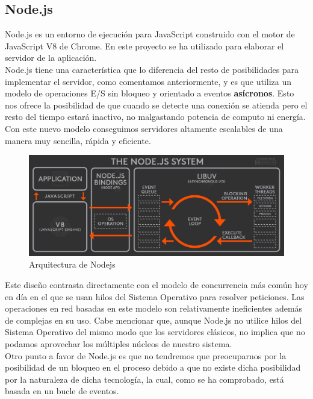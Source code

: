 \subsection{Node.js}

Node.js es un entorno de ejecución para JavaScript construido con el motor de JavaScript
V8 de Chrome. En este proyecto se ha utilizado para elaborar el servidor de la aplicación.\\

Node.js tiene una característica que lo diferencia del resto de posibilidades para implementar 
el servidor, como comentamos anteriormente, y es que utiliza un modelo de operaciones E/S sin bloqueo y orientado a eventos 
\textbf{asícronos}. Esto nos ofrece la posibilidad de que cuando se detecte una conexión se atienda
pero el resto del tiempo estará inactivo, no malgastando potencia de computo ni energía. Con este nuevo modelo conseguimos servidores altamente 
escalables de una manera muy sencilla, rápida y eficiente.\\

\begin{figure}[H]
	\centering
	\includegraphics[scale=0.25]{imagenes/nodejs_system.jpg}
	\caption{Arquitectura de Nodejs\cite{image-node-arch} \label{fig:figura1}}
\end{figure}

Este diseño contrasta directamente con el modelo de concurrencia más común hoy en 
día en el que se usan hilos del Sistema Operativo para resolver peticiones. Las operaciones en red basadas en este modelo son relativamente ineficientes además de complejas en su uso. Cabe mencionar que, aunque Node.js 
no utilice hilos del Sistema Operativo del mismo modo que los servidores clásicos, no implica que no podamos aprovechar los múltiples núcleos de nuestro sistema.\\

Otro punto a favor de Node.js es que no tendremos que preocuparnos por la posibilidad de un 
bloqueo en el proceso debido a que no existe dicha posibilidad por la naturaleza de dicha 
tecnología, la cual, como se ha comprobado, está basada en un bucle de eventos.

